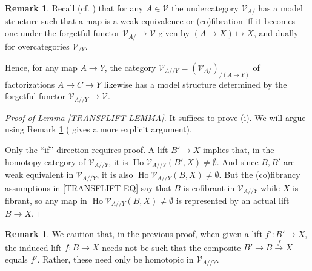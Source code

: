 \documentclass[a4paper,10pt
 ,final
]{article}%
\numberwithin{equation}{section}
\numberwithin{figure}{section}
\theoremstyle{definition} %
\newtheorem{remark}[equation]{Remark}%
\DeclareMathOperator{\Ho}{Ho}
\newcommand{\V}{\ensuremath{\mathcal V}}
\newcommand{\1}{\ensuremath{\mathbbm 1}}%
\begin{document}
\begin{remark}\label{UNDEROVER REM}
	Recall (cf. \cite[Rem. 3.10]{DS95})
	that for any $A \in \V$ the undercategory $\V_{A/}$
	has a model structure such that a map is a 
	weak equivalence or (co)fibration iff it becomes one under the 
	forgetful functor
	$\V_{A/} \to \V$ given by $(A \to X) \mapsto X$,
	and dually for overcategories $\V_{/Y}$.
	
	Hence, for any map $A \to Y$,
	the category 
	$\V_{A//Y} = \left(\V_{A/}\right)_{/(A\to Y)}$
	of factorizations $A \to C \to Y$
	likewise has a model structure determined by the forgetful functor
	$\V_{A//Y} \to \V$.
\end{remark}


\begin{proof}[Proof of Lemma \ref{TRANSFLIFT LEMMA}]
        It suffices to prove (i).
	We will argue using Remark \ref{UNDEROVER REM}
	(\cite{Ber07b} gives a more explicit argument).
	
	Only the ``if'' direction requires proof.
	A lift $B' \to X$ implies that,
	in the homotopy category of $\V_{A//Y}$, it is
	$\Ho \V_{A//Y}(B',X) \neq \emptyset$. 
	And since $B,B'$ are weak equivalent in 
	$\V_{A//Y}$, it is also 
	$\Ho \V_{A//Y}(B,X) \neq \emptyset$.
	But the (co)fibrancy assumptions in \eqref{TRANSFLIFT EQ}
	say that $B$ is cofibrant in $\V_{A//Y}$ while 
	$X$ is fibrant, so any map in $\Ho \V_{A//Y}(B,X) \neq \emptyset$
	is represented by an actual lift $B \to X$.
\end{proof}


\begin{remark}\label{NOTMATCH REM}
	We caution that, in the previous proof, when given a lift $f'\colon B' \to X$,
	the induced lift $f \colon B \to X$
	needs not be such that the composite $B' \to B \xrightarrow{f} X$
	equals $f'$. Rather, these need only be homotopic in 
	$\V_{A//Y}$.
\end{remark}
\end{document}
